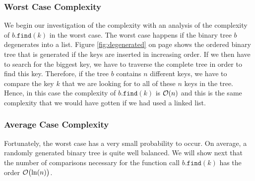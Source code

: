 \subsubsection{Worst Case Complexity}
We begin our investigation of the complexity with an analysis of the complexity of $b.\texttt{find}(k)$ 
in the worst case.  The worst case happens if the binary tree $b$ degenerates into a list.
Figure \ref{fig:degenerated} on page \pageref{fig:degenerated} shows the ordered binary tree that
is generated if the keys are inserted in increasing order.  If we then have to search for the
biggest key, we have to traverse the complete tree in order to find this key.  Therefore, if the
tree $b$ contains $n$ different keys, we have to compare the key $k$ that we are looking for to all
of these $n$ keys in the tree.  Hence, in this case the complexity of $b.\texttt{find}(k)$ is 
$\mathcal{O}(n)$ and this is the same complexity that we would have gotten if we had used a linked list.


\subsubsection{Average Case Complexity}
Fortunately, the worst case has a very small probability to occur. On average, a randomly generated
binary tree is quite well balanced.  We will show next that the number of comparisons necessary for
the function call $b.\texttt{find}(k)$ has the order $\mathcal{O}\bigl(\ln(n)\bigr)$.  





